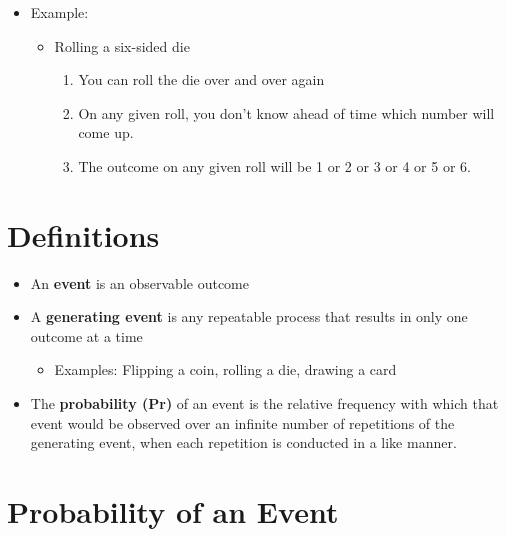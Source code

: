 \documentclass[12pt]{article}
\begin{document}
\begin{itemize}
\itemsep1pt\parskip0pt
\item
  Example:

  \begin{itemize}
  \itemsep1pt\parskip0pt
  \item
    Rolling a six-sided die

    \begin{enumerate}
    \def\labelenumi{\arabic{enumi}.}
    \itemsep1pt\parskip0pt
    \item
      You can roll the die over and over again
    \item
      On any given roll, you don't know ahead of time which number will
      come up.
    \item
      The outcome on any given roll will be 1 or 2 or 3 or 4 or 5 or 6.
    \end{enumerate}
  \end{itemize}
\end{itemize}

\section{Definitions}\label{definitions}

\begin{itemize}
\itemsep1pt\parskip0pt
\item
  An \textbf{event} is an observable outcome
\item
  A \textbf{generating event} is any repeatable process that results in
  only one outcome at a time

  \begin{itemize}
  \itemsep1pt\parskip0pt
  \item
    Examples: Flipping a coin, rolling a die, drawing a card
  \end{itemize}
\item
  The \textbf{probability (Pr)} of an event is the relative frequency
  with which that event would be observed over an infinite number of
  repetitions of the generating event, when each repetition is conducted
  in a like manner.
\end{itemize}

\section{Probability of an Event}\label{probability-of-an-event}
\end{document}
